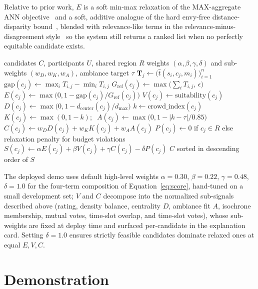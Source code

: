 \documentclass[sigconf]{acmart}
\begin{document}
Relative to prior work, $E$ is a soft min-max relaxation of the MAX-aggregate ANN objective~\cite{papadias2005ann} and a soft, additive analogue of the hard envy-free distance-disparity bound~\cite{singhal2022envyfree}, blended with relevance-like terms in the relevance-minus-disagreement style~\cite{ameryahia2009group} so the system still returns a ranked list when no perfectly equitable candidate exists.

\begin{algorithm}[!htbp]
\small
\caption{Fairness-aware ranking}
\label{alg:rank}
\begin{algorithmic}[1]
\Require candidates $C$, participants $U$, shared region $R$
\Require weights $(\alpha, \beta, \gamma, \delta)$ and sub-weights $(w_D, w_K, w_A)$, ambiance target $\tau$
  \State $\mathbf{T}_j \gets \bigl(\hat{t}(s_i, c_j, m_i)\bigr)_{i=1}^{n}$
  \State $\mathrm{gap}(c_j) \gets \max_i T_{i,j} - \min_i T_{i,j}$
  \State $G_{\mathrm{ref}}(c_j) \gets \max\!\bigl(\sum_i T_{i,j},\, \epsilon\bigr)$
  \State $E(c_j) \gets \max\!\bigl(0, 1 - \mathrm{gap}(c_j)/G_{\mathrm{ref}}(c_j)\bigr)$
  \State $V(c_j) \gets \mathrm{suitability}(c_j)$
  \State $D(c_j) \gets \max\!\bigl(0, 1 - d_{\mathrm{center}}(c_j)/d_{\max}\bigr)$
  \State $k \gets \mathrm{crowd\_index}(c_j)$
  \State $K(c_j) \gets \max(0, 1-k);\;\; A(c_j) \gets \max\!\bigl(0, 1 - |k-\tau|/0.85\bigr)$
  \State $C(c_j) \gets w_D D(c_j) + w_K K(c_j) + w_A A(c_j)$
  \State $P(c_j) \gets 0$ if $c_j \in R$ else relaxation penalty for budget violations
  \State $S(c_j) \gets \alpha E(c_j) + \beta V(c_j) + \gamma C(c_j) - \delta P(c_j)$
\EndFor
\State \Return $C$ sorted in descending order of $S$
\end{algorithmic}
\end{algorithm}

The deployed demo uses default high-level weights $\alpha=0.30$, $\beta=0.22$, $\gamma=0.48$, $\delta=1.0$ for the four-term composition of Equation~\eqref{eq:score}, hand-tuned on a small development set; $V$ and $C$ decompose into the normalized sub-signals described above (rating, density balance, centrality $D$, ambiance fit $A$, isochrone membership, mutual votes, time-slot overlap, and time-slot votes), whose sub-weights are fixed at deploy time and surfaced per-candidate in the explanation card. Setting $\delta=1.0$ ensures strictly feasible candidates dominate relaxed ones at equal $E,V,C$.


\section{Demonstration}
\end{document}
